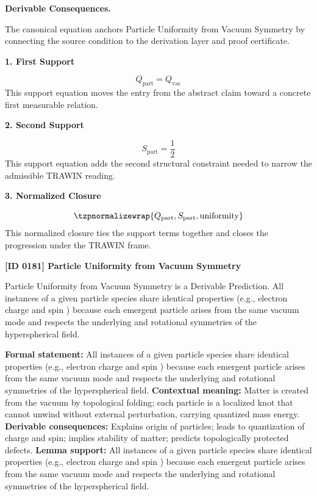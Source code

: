 \par\vspace{0.35em}
\noindent\textbf{Derivable Consequences.}\quad
\begingroup
\footnotesize
\raggedright
The canonical equation anchors Particle Uniformity from Vacuum Symmetry by connecting the source condition to the derivation layer and proof certificate.
\par\endgroup

\noindent\textbf{1. First Support}\par
\[
Q_{\mathrm{part}} = Q_{\mathrm{vac}}
\]
\noindent This support equation moves the entry from the abstract claim toward a concrete first measurable relation.\par
\noindent\textbf{2. Second Support}\par
\[
S_{\mathrm{part}} = \frac{1}{2}
\]
\noindent This support equation adds the second structural constraint needed to narrow the admissible TRAWIN reading.\par
\noindent\textbf{3. Normalized Closure}\par
\[
\tzpnormalizewrap{Q_{\mathrm{part}},S_{\mathrm{part}},\text{uniformity}}
\]
\noindent This normalized closure ties the support terms together and closes the progression under the TRAWIN frame.\par

\clearpage
\noindent\textbf{[ID 0181] Particle Uniformity from Vacuum Symmetry}\par
\vspace{0.35em}
\begingroup\small
{}
Particle Uniformity from Vacuum Symmetry is a Derivable Prediction. All instances of a given particle species share identical properties (e.g., electron charge and spin ) because each emergent particle arises from the same vacuum mode and respects the underlying and rotational symmetries of the hyperspherical field.  

\begingroup\footnotesize\setlength{\emergencystretch}{3em}\sloppy
\textbf{Formal statement:} All instances of a given particle species share identical properties (e.g., electron charge and spin ) because each emergent particle arises from the same vacuum mode and respects the underlying and rotational symmetries of the hyperspherical field.  
\textbf{Contextual meaning:} Matter is created from the vacuum by topological folding; each particle is a localized knot that cannot unwind without external perturbation, carrying quantized mass energy.
\textbf{Derivable consequences:} Explains origin of particles; leads to quantization of charge and spin; implies stability of matter; predicts topologically protected defects.
\textbf{Lemma support:} All instances of a given particle species share identical properties (e.g., electron charge and spin ) because each emergent particle arises from the same vacuum mode and respects the underlying and rotational symmetries of the hyperspherical field.  \par
\endgroup

